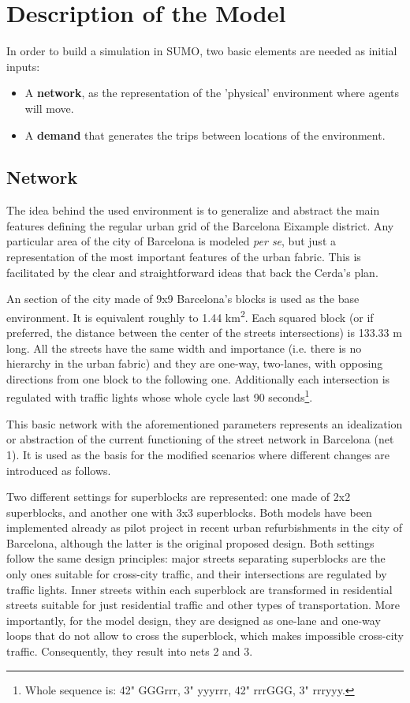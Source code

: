\documentclass[11pt]{article}
\begin{document}
\section{Description of the Model}

In order to build a simulation in SUMO, two basic elements are needed as initial inputs:
\begin{itemize}
    \item A \textbf{network}, as the representation of the 'physical' environment where agents will move.
    \item  A \textbf{demand} that generates the trips between locations of the environment.
\end{itemize}

\subsection {Network}

The idea behind the used environment is to generalize and abstract the main features defining the regular urban grid of the Barcelona Eixample district. Any particular area of the city of Barcelona is modeled \textit{per se}, but just a representation of the most important features of the urban fabric. This is facilitated by the clear and straightforward ideas that back the Cerda's plan.

An section of the city made of 9x9 Barcelona's blocks is used as the base environment. It is equivalent roughly to 1.44 km\textsuperscript{2}. Each squared block (or if preferred, the distance between the center of the streets intersections) is 133.33 m long. All the streets have the same width and importance (i.e. there is no hierarchy in the urban fabric) and they are one-way, two-lanes, with opposing directions from one block to the following one. Additionally each intersection is regulated with traffic lights whose whole cycle last 90 seconds\footnote{Whole sequence is: 42" GGGrrr, 3" yyyrrr, 42" rrrGGG, 3" rrryyy.}.

This basic network with the aforementioned parameters represents an idealization or abstraction of the current functioning of the street network in Barcelona (net 1). It is used as the basis for the modified scenarios where different changes are introduced as follows.

Two different settings for superblocks are represented: one made of 2x2 superblocks, and another one with 3x3 superblocks. Both models have been implemented already as pilot project in recent urban refurbishments in the city of Barcelona, although the latter is the original proposed design. Both settings follow the same design principles: major streets separating superblocks are the only ones suitable for cross-city traffic, and their intersections are regulated by traffic lights. Inner streets within each superblock are transformed in residential streets suitable for just residential traffic and other types of transportation. More importantly, for the model design, they are designed as one-lane and one-way loops that do not allow to cross the superblock, which makes impossible cross-city traffic. Consequently, they result into nets 2 and 3.
\end{document}
